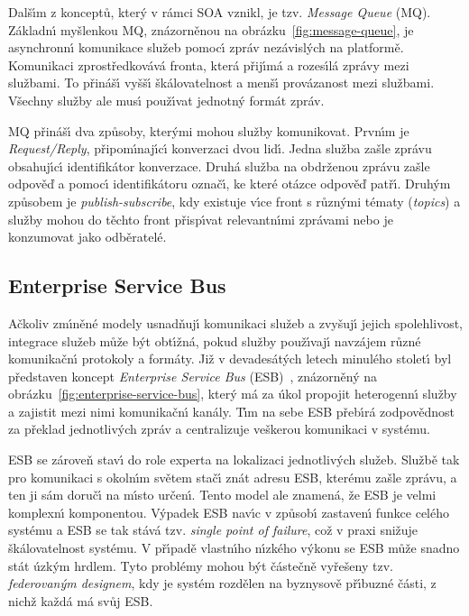 Dalš\'{\i}m z konceptů, kter\'y v rámci \gls{SOA} vznikl, je tzv. \textit{Message Queue} (\gls{MQ}).
Základn\'{\i} myšlenkou \gls{MQ}, znázorněnou na obrázku~\ref{fig:message-queue},
je asynchronn\'{\i} komunikace služeb pomoc\'{\i} zpráv nezávisl\'ych
na platformě. Komunikaci zprostředkovává fronta, která přij\'{\i}má a rozes\'{\i}lá
zprávy mezi službami. To přináš\'{\i} vyšš\'{\i} škálovatelnost a menš\'{\i} provázanost
mezi službami. Všechny služby ale mus\'{\i} použ\'{\i}vat jednotn\'y formát zpráv.

\gls{MQ} přináš\'{\i} dva způsoby, kter\'ymi mohou služby komunikovat. Prvn\'{\i}m je
\textit{Request/Reply}, připom\'{\i}naj\'{\i}c\'{\i} konverzaci dvou lid\'{\i}. Jedna
služba zašle zprávu obsahuj\'{\i}c\'{\i} identifikátor konverzace. Druhá služba
na obdrženou zprávu zašle odpověď a pomoc\'{\i} identifikátoru označ\'{\i},
ke které otázce odpověď patř\'{\i}. Druh\'ym způsobem je \textit{publish-subscribe},
kdy existuje v\'{\i}ce front s různ\'ymi tématy (\textit{topics}) a služby mohou
do těchto front přisp\'{\i}vat relevantn\'{\i}mi zprávami nebo je konzumovat jako odběratelé.

\subsection{Enterprise Service Bus}

Ačkoliv zm\'{\i}něné modely usnadňuj\'{\i} komunikaci služeb a zvyšuj\'{\i} jejich
spolehlivost, integrace služeb může b\'yt obt\'{\i}žná, pokud služby použ\'{\i}vaj\'{\i} navzájem různé
komunikačn\'{\i} protokoly a formáty. Již v devadesát\'ych letech minulého stolet\'{\i}
byl představen koncept \textit{Enterprise Service
Bus} (\gls{ESB})~\cite{chappell2004enterprise},
znázorněn\'y na obrázku~\ref{fig:enterprise-service-bus},
kter\'y má za úkol propojit heterogenn\'{\i} služby a zajistit mezi nimi
komunikačn\'{\i} kanály. T\'{\i}m na sebe \gls{ESB} přeb\'{\i}rá zodpovědnost za překlad
jednotliv\'ych zpráv a centralizuje veškerou komunikaci v systému.

\gls{ESB} se zároveň stav\'{\i} do role experta na lokalizaci jednotliv\'ych služeb.
Službě tak pro komunikaci s okoln\'{\i}m světem stač\'{\i} znát adresu \gls{ESB}, kterému
zašle zprávu, a ten ji sám doruč\'{\i} na m\'{\i}sto určen\'{\i}. Tento model ale
znamená, že \gls{ESB} je velmi komplexn\'{\i} komponentou. V\'ypadek \gls{ESB} nav\'{\i}c
v způsob\'{\i} zastaven\'{\i} funkce celého systému a \gls{ESB} se tak stává
tzv. \textit{single point of failure}, což v praxi snižuje škálovatelnost systému.
V př\'{\i}padě vlastn\'{\i}ho n\'{\i}zkého v\'ykonu se \gls{ESB} může snadno stát úzk\'ym hrdlem.
Tyto problémy mohou b\'yt částečně vyřešeny tzv. \textit{federovan\'ym designem},
kdy je systém rozdělen na byznysově př\'{\i}buzné části, z nichž každá má
svůj \gls{ESB}.

